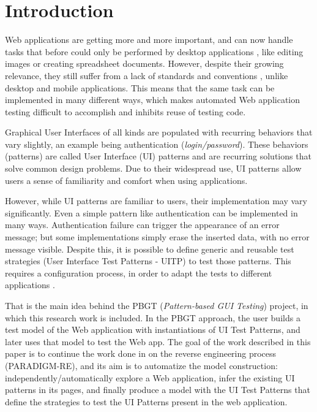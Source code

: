 \documentclass[conference]{IEEEtran}
\begin{document}
\IEEEpeerreviewmaketitle

\section{Introduction}\label{sec:intro}

Web applications are getting more and more important, and can now handle tasks that before could only be performed by desktop applications \cite{garrett2005ajax}, like editing images or creating spreadsheet documents. However, despite their growing relevance, they still suffer from a lack of standards and conventions \cite{constantine2002usage}, unlike desktop and mobile applications. This means that the same task can be implemented in many different ways, which makes automated Web application testing difficult to accomplish and inhibits reuse of testing code. 

Graphical User Interfaces of all kinds are populated with recurring behaviors that vary slightly, an example being authentication (\textit{login/password}). These behaviors (patterns) are called User Interface (UI) patterns \cite{van2001patterns} and are recurring solutions that solve common design problems. Due to their widespread use, UI patterns allow users a sense of familiarity and comfort when using applications. 

However, while UI patterns are familiar to users, their implementation may vary significantly. Even a simple pattern like authentication can be implemented in many ways. Authentication failure can trigger the appearance of an error message; but some implementations simply erase the inserted data, with no error message visible. Despite this, it is possible to define generic and reusable test strategies (User Interface Test Patterns - UITP) to test those patterns. This requires a configuration process, in order to adapt the tests to different applications \cite{morgado2012gui}. 

That is the main idea behind the PBGT (\textit{Pattern-based GUI Testing}) project, in which this research work is included. In the PBGT approach, the user builds a test model of the Web application with instantiations of UI Test Patterns, and later uses that model to test the Web app.  The goal of the work described in this paper is to continue the work done in \cite{nabuco2013inferring} on the reverse engineering process (PARADIGM-RE), and its aim is to automatize the model construction: independently/automatically explore a Web application, infer the existing UI patterns in its pages, and finally produce a model with the UI Test Patterns that define the strategies to test the UI Patterns present in the web application.
\end{document}
